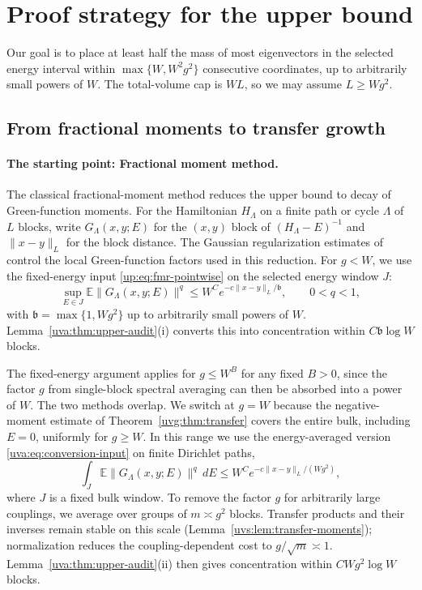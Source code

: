 \documentclass[11pt]{article}
\numberwithin{equation}{section}
\theoremstyle{remark}
\newcommand{\E}{\mathbb E}
\begin{document}
\section{Proof strategy for the upper bound}
\label{sec:intro-concentration-methods}

 
Our goal is to place at least half the mass of most eigenvectors
in the selected energy interval within $\max\{W,W^2g^2\}$ consecutive
coordinates, up to arbitrarily small powers of $W$. The total-volume
cap is $WL$, so we may assume
$L\ge Wg^2$.

\subsection{From fractional moments to transfer growth}
\label{sec:intro-upper-reductions}

\paragraph{The starting point: Fractional moment method.}
The classical fractional-moment method \cite{AM,ASFH} reduces the
upper bound to decay of Green-function moments. For the Hamiltonian
$H_\Lambda$ on a finite path or cycle $\Lambda$ of $L$ blocks,
write $G_\Lambda(x,y;E)$ for the $(x,y)$ block of
$(H_\Lambda-E)^{-1}$ and $\|x-y\|_L$ for the block distance.
The Gaussian regularization estimates of \cite{APSSS} control the
local Green-function factors used in this reduction.
For $g<W$, we use the fixed-energy input
\eqref{up:eq:fmr-pointwise} on the selected energy window $J$:
\[
 \sup_{E\in J}\E\|G_\Lambda(x,y;E)\|^q
 \le W^C e^{-c\|x-y\|_L/\mathfrak b},\qquad 0<q<1,
\]
with $\mathfrak b=\max\{1,Wg^2\}$ up to arbitrarily small powers of $W$.
Lemma~\ref{uva:thm:upper-audit}\textup{(i)} converts this into
concentration within $C\mathfrak b\log W$ blocks.

The fixed-energy argument applies for $g\le W^B$ for any fixed $B>0$,
since the factor $g$ from single-block spectral averaging can then be
absorbed into a power of $W$. The two methods overlap. We switch at
$g=W$ because the negative-moment estimate of Theorem~\ref{uvg:thm:transfer}
covers the entire bulk, including $E=0$, uniformly for $g\ge W$.
In this range we use the energy-averaged version
\eqref{uva:eq:conversion-input} on finite Dirichlet paths,
\[
 \int_J\E\|G_\Lambda(x,y;E)\|^q\,dE
 \le W^C e^{-c\|x-y\|_L/(Wg^2)},
\]
where $J$ is a fixed bulk window. To remove the factor $g$ for arbitrarily
large couplings, we average over groups of $m\asymp g^2$ blocks. Transfer products
and their inverses remain stable on this scale
(Lemma~\ref{uvs:lem:transfer-moments}); normalization reduces the
coupling-dependent cost to $g/\sqrt m\asymp1$.
Lemma~\ref{uva:thm:upper-audit}\textup{(ii)} then gives concentration
within $CWg^2\log W$ blocks.
\end{document}
